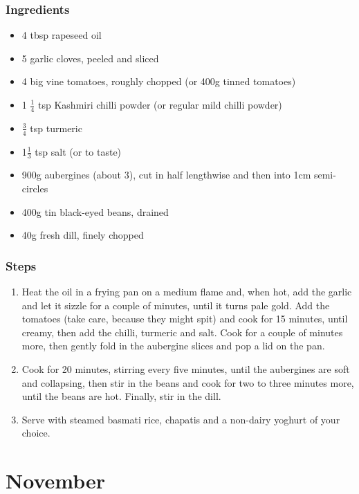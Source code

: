 \documentclass{book}
\begin{document}
\subsection*{Ingredients}
\begin{itemize}
\item 4 tbsp rapeseed oil
\item 5 garlic cloves, peeled and sliced
\item 4 big vine tomatoes, roughly chopped (or 400g tinned tomatoes)
\item 1 $\frac{1}{4}$ tsp Kashmiri chilli powder (or regular mild chilli powder)
\item $\frac{3}{4}$ tsp turmeric
\item 1$\frac{1}{3}$ tsp salt (or to taste) 
\item 900g aubergines (about 3), cut in half lengthwise and then into 1cm semi-circles
\item 400g tin black-eyed beans, drained
\item 40g fresh dill, finely chopped 
\end{itemize}

\subsection*{Steps}
\begin{enumerate}
\item Heat the oil in a frying pan on a medium flame and, when hot, add the garlic and let it sizzle for a couple of minutes, until it turns pale gold. Add the tomatoes (take care, because they might spit) and cook for 15 minutes, until creamy, then add the chilli, turmeric and salt. Cook for a couple of minutes more, then gently fold in the aubergine slices and pop a lid on the pan.
\item Cook for 20 minutes, stirring every five minutes, until the aubergines are soft and collapsing, then stir in the beans and cook for two to three minutes more, until the beans are hot. Finally, stir in the dill.
\item Serve with steamed basmati rice, chapatis and a non-dairy yoghurt of your choice.
\end{enumerate}
\newpage

\chapter{November}
\end{document}
